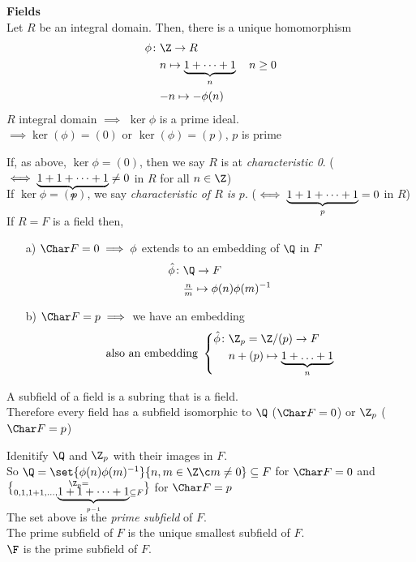 \textbf{Fields} \\
Let $R$ be an integral domain.  Then, there is a unique homomorphism
\begin{align*}
\phi\colon & \Z \to R \\
& n \mapsto \underbrace{1+\dotsb+1}_n \quad n\geq0 \\
& {-n} \mapsto -\phi(n)
\end{align*}
\recall $R$ integral domain $\implies$ $\ker\phi$ is a prime ideal. \\
$\implies \ker(\phi)=(0)$ or $\ker(\phi)=(p)$, $p$ is prime

 If, as above, $\ker\phi=(0)$, then we say $R$ is at \emph{characteristic 0}. ($\iff\smash{\underbrace{1+1+\dotsb+1}_n}\neq0$ in $R$ for all $n\in\Z$) \\
If $\ker\phi=(p)$, we say \emph{characteristic of $R$ is $p$}. ($\iff\smash{\underbrace{1+1+\dotsb+1}_p}=0$ in $R$)

\remark If $R=F$ is a field then,
\begin{enumerate}
\item[a)] $\Char F=0\implies\phi$ extends to an embedding of $\Q$ in $F$
\begin{align*}
\hat\phi\colon &\Q \to F \\
& \tfrac nm \mapsto \phi(n)\phi(m)^{-1}
\end{align*}
\item[b)] $\Char F=p\implies$ we have an embedding
\[ \text{also an embedding }\left\{ \begin{aligned}
\hat\phi\colon & \Z_p = \Z/(p) \to F \\
&n+(p) \mapsto \underbrace{1+\dotsc+1}_n
\end{aligned} \right. \]
\end{enumerate}
 A subfield of a field is a subring that is a field. \\
Therefore every field has a subfield isomorphic to $\Q$ ($\Char F=0$) or $\Z_p$ ($\Char F=p$)

\convention Idenitify $\Q$ and $\Z_p$ with their images in $F$. \\
So $\Q=\set{\phi(n)\phi(m)^{-1}}{n,m\in\Z\c m\neq0}\subseteq F$ for $\Char F=0$ and $\Z_p=\brace{0,1,1+1,\dotsc,\smash{\underbrace{1+1+\dotsb+1}_{p-1}}}\subseteq F$ for $\Char F=p$

 The set above is the \emph{prime subfield} of $F$. \\
\exer The prime subfield of $F$ is the unique smallest subfield of $F$. \\
\notation $\F$ is the prime subfield of $F$.
